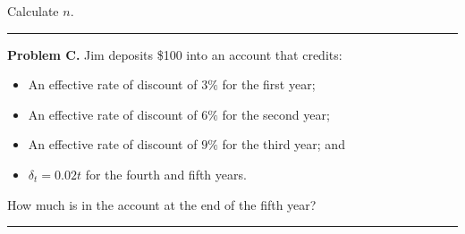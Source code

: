 \documentclass[11pt]{article}
\begin{document}
Calculate $n$.

\medskip

\hrule


\medskip


\textbf{Problem C.} Jim deposits \$100 into an account that credits:
\begin{itemize}[leftmargin=2em]
    \item An effective rate of discount of $3\%$ for the first year;
    \item An effective rate of discount of $6\%$ for the second year;
    \item An effective rate of discount of $9\%$ for the third year; and
    \item $\delta_t = 0.02t$ for the fourth and fifth years.
\end{itemize}

How much is in the account at the end of the fifth year?

\medskip

\hrule
\end{document}

